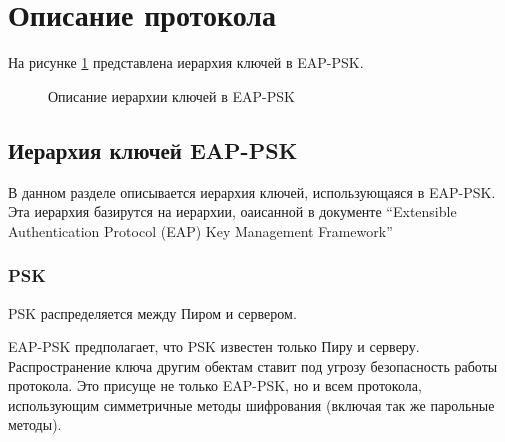 \newpage
\section{Описание протокола}

На рисунке \ref{img:key_hierarchy} представлена иерархия ключей в EAP-PSK.

\begin{figure}[h!]
\caption{Описание иерархии ключей в EAP-PSK}
\label{img:key_hierarchy}
\end{figure}

\subsection{Иерархия ключей EAP-PSK}

В данном разделе описывается иерархия ключей, использующаяся в EAP-PSK. Эта иерархия базирутся на иерархии, оаисанной в документе ``Extensible Authentication Protocol (EAP) Key Management Framework''

\subsubsection{PSK}

PSK распределяется между Пиром и сервером.

EAP-PSK предполагает, что PSK известен только Пиру и серверу. Распространение ключа другим обектам ставит под угрозу безопасность работы протокола. Это присуще не только EAP-PSK, но и всем протокола, использующим симметричные методы шифрования (включая так же парольные методы).

